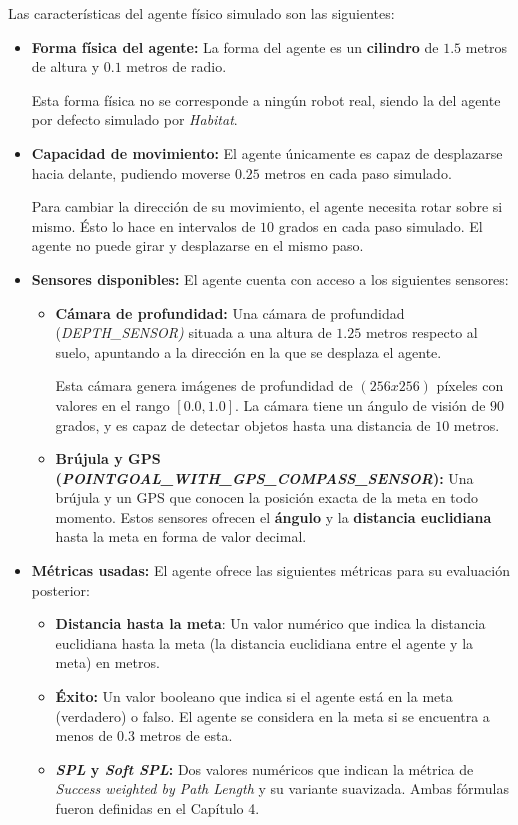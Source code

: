 Las características del agente físico simulado son las siguientes:
\begin{itemize}
	\item \textbf{Forma física del agente:} La forma del agente es un \textbf{cilindro} de $1.5$ metros de altura y $0.1$ metros de radio.
	
	Esta forma física no se corresponde a ningún robot real, siendo la del agente por defecto simulado por \textit{Habitat}.
	\item \textbf{Capacidad de movimiento:} El agente únicamente es capaz de desplazarse hacia delante, pudiendo moverse $0.25$ metros en cada paso simulado.
	
	Para cambiar la dirección de su movimiento, el agente necesita rotar sobre si mismo. Ésto lo hace en intervalos de $10$ grados en cada paso simulado. El agente no puede girar y desplazarse en el mismo paso.
	\item \textbf{Sensores disponibles:} El agente cuenta con acceso a los siguientes sensores:
	\begin{itemize}
		\item \textbf{Cámara de profundidad:} Una cámara de profundidad (\textit{DEPTH{\_}SENSOR)} situada a una altura de $1.25$ metros respecto al suelo, apuntando a la dirección en la que se desplaza el agente.
		
		Esta cámara genera imágenes de profundidad de $(256x256)$ píxeles con valores en el rango $[0.0, 1.0]$. La cámara tiene un ángulo de visión de $90$ grados, y es capaz de detectar objetos hasta una distancia de $10$ metros.
		\item \textbf{Brújula y GPS (\textit{POINTGOAL{\_}WITH{\_}GPS{\_}COMPASS{\_}SENSOR}):} Una brújula y un GPS que conocen la posición exacta de la meta en todo momento. Estos sensores ofrecen el \textbf{ángulo} y la \textbf{distancia euclidiana} hasta la meta en forma de valor decimal.
	\end{itemize}
	\item \textbf{Métricas usadas:} El agente ofrece las siguientes métricas para su evaluación posterior:
	\begin{itemize}
		\item \textbf{Distancia hasta la meta}: Un valor numérico que indica la distancia euclidiana hasta la meta (la distancia euclidiana entre el agente y la meta) en metros.
		\item \textbf{Éxito:} Un valor booleano que indica si el agente está en la meta (verdadero) o falso. El agente se considera en la meta si se encuentra a menos de $0.3$ metros de esta.
		\item \textbf{\textit{SPL} y \textit{Soft SPL}:} Dos valores numéricos que indican la métrica de \textit{Success weighted by Path Length} \cite{DBLP:journals/corr/abs-1807-06757} y su variante suavizada. Ambas fórmulas fueron definidas en el Capítulo 4.
	\end{itemize}
\end{itemize}

